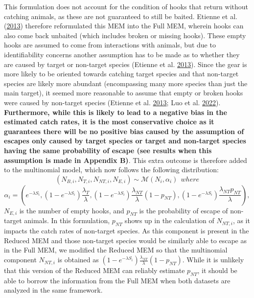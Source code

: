 \documentclass[12pt]{article}\usepackage[]{graphicx}\usepackage[]{color}
\begin{document}
This formulation does not account for the condition of hooks that return without catching animals, as these are not guaranteed to still be baited. Etienne et al. (\protect\hyperlink{ref-Etienne2013}{2013}) therefore reformulated this MEM into the Full MEM, wherein hooks can also come back unbaited (which includes broken or missing hooks). These empty hooks are assumed to come from interactions with animals, but due to identifiability concerns another assumption has to be made as to whether they are caused by target or non-target species (Etienne et al. \protect\hyperlink{ref-Etienne2013}{2013}). Since the gear is more likely to be oriented towards catching target species and that non-target species are likely more abundant (encompassing many more species than just the main target), it seemed more reasonable to assume that empty or broken hooks were caused by non-target species (Etienne et al. \protect\hyperlink{ref-Etienne2013}{2013}; Luo et al. \protect\hyperlink{ref-Luo2022}{2022}). \textbf{Furthermore, while this is likely to lead to a negative bias in the estimated catch rates, it is the most conservative choice as it guarantees there will be no positive bias caused by the assumption of escapes only caused by target species or target and non-target species having the same probability of escape (see results when this assumption is made in Appendix B)}. This extra outcome is therefore added to the multinomial model, which now follows the following distribution:
\begin{equation}
(N_{B,i},N_{T,i},N_{NT,i},N_{E,i}) \sim \mathcal{M}(N_i,\alpha_i) \ \ where
\end{equation} \begin{equation}
\alpha_i = (e^{-\lambda S_i},(1-e^{-\lambda S_i})\frac{\lambda_T}{\lambda},(1-e^{-\lambda S_i})\frac{\lambda_{NT}}{\lambda}(1-p_{NT}),(1-e^{-\lambda S_i})\frac{\lambda_{NT}p_{NT}}{\lambda}),
\end{equation}
\(N_{E,i}\) is the number of empty hooks, and \(p_{NT}\) is the probability of escape of non-target animals. In this formulation, \(p_{NT}\) shows up in the calculation of \(N_{NT,i}\), as it impacts the catch rates of non-target species. As this component is present in the Reduced MEM and those non-target species would be similarly able to escape as in the Full MEM, we modified the Reduced MEM so that the multinomial component \(N_{NT,i}\) is obtained as \((1-e^{-\lambda S_i})\frac{\lambda_{NT}}{\lambda}(1-p_{NT})\). While it is unlikely that this version of the Reduced MEM can reliably estimate \(p_{NT}\), it should be able to borrow the information from the Full MEM when both datasets are analyzed in the same framework.
\end{document}
